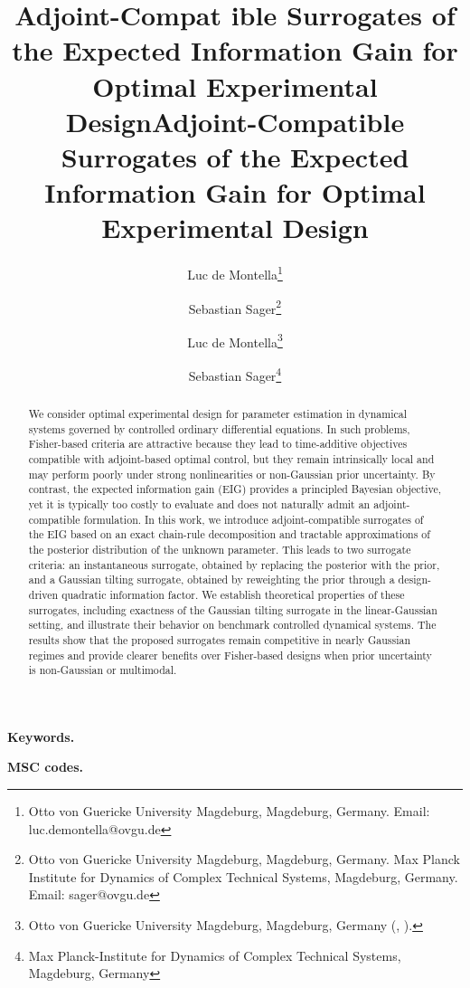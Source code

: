 \documentclass[a4paper,11pt]{article}
\title{Adjoint-Compat ible Surrogates of the Expected Information Gain for Optimal Experimental Design}
\author{
Luc de Montella\thanks{Otto von Guericke University Magdeburg, Magdeburg, Germany. 
Email: luc.demontella@ovgu.de}
\and
Sebastian Sager\thanks{Otto von Guericke University Magdeburg, Magdeburg, Germany. 
Max Planck Institute for Dynamics of Complex Technical Systems, Magdeburg, Germany. 
Email: sager@ovgu.de}
}
\date{}
\title{Adjoint-Compatible Surrogates of the Expected Information Gain for Optimal Experimental Design}
\author{
Luc de Montella\thanks{Otto von Guericke University Magdeburg, Magdeburg, Germany
(\email{luc.demontella@ovgu.de}, \email{sager@ovgu.de}).}
\and
Sebastian Sager\footnotemark[1]\thanks{Max Planck-Institute for Dynamics of Complex Technical Systems, Magdeburg, Germany}
}
\makeatletter
\providecommand{\@keywords}{}
\providecommand{\@mscodes}{}
\makeatother
\begin{document}
\maketitle

\begin{abstract}
We consider optimal experimental design for parameter estimation in dynamical systems governed by controlled ordinary differential equations. In such problems, Fisher-based criteria are attractive because they lead to time-additive objectives compatible with adjoint-based optimal control, but they remain intrinsically local and may perform poorly under strong nonlinearities or non-Gaussian prior uncertainty. By contrast, the expected information gain (EIG) provides a principled Bayesian objective, yet it is typically too costly to evaluate and does not naturally admit an adjoint-compatible formulation.
In this work, we introduce adjoint-compatible surrogates of the EIG based on an exact chain-rule decomposition and tractable approximations of the posterior distribution of the unknown parameter. This leads to two surrogate criteria: an instantaneous surrogate, obtained by replacing the posterior with the prior, and a Gaussian tilting surrogate, obtained by reweighting the prior through a design-driven quadratic information factor. 
We establish theoretical properties of these surrogates, including exactness of the Gaussian tilting surrogate in the linear-Gaussian setting, and illustrate their behavior on benchmark controlled dynamical systems. The results show that the proposed surrogates remain competitive in nearly Gaussian regimes and provide clearer benefits over Fisher-based designs when prior uncertainty is non-Gaussian or multimodal.
\end{abstract}

%

\makeatletter
\ifx\@keywords\@empty\else
\par\smallskip
\noindent\textbf{Keywords.} \@keywords\par
\fi

\ifx\@mscodes\@empty\else
\smallskip
\noindent\textbf{MSC codes.} \@mscodes\par
\fi
\makeatother
\end{document}

